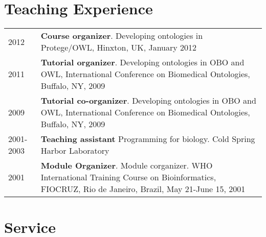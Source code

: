 \documentclass[11pt,fullpage]{article}
\begin{document}


\section*{Teaching Experience}

\begin{longtable}{p{0.5in}|p{5.5in}}
	2012 &  \textbf{Course organizer}. Developing ontologies in
        Protege/OWL, Hinxton, UK, January 2012 \\
	2011 &  \textbf{Tutorial organizer}. Developing ontologies in
        OBO and OWL, International Conference on Biomedical Ontologies, Buffalo, NY, 2009 \\
	2009 &  \textbf{Tutorial co-organizer}. Developing ontologies in
        OBO and OWL, International Conference on Biomedical Ontologies, Buffalo, NY, 2009 \\
	2001-2003 &  \textbf{Teaching assistant} Programming for
        biology. Cold Spring Harbor Laboratory\\
	2001 &  \textbf{Module Organizer}. Module corganizer.
        WHO International Training Course on Bioinformatics,
        FIOCRUZ, Rio de Janeiro, Brazil, May 21-June 15, 2001 \\
\end{longtable}


\section*{Service}

\end{document}
